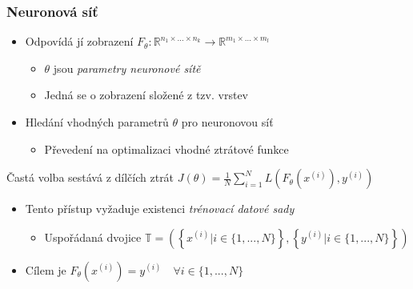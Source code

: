 \documentclass[czech]{beamer}
\begin{document}
\begin{frame}
    \frametitle{Neuronová síť}
    \begin{itemize}
        \item Odpovídá jí zobrazení $F_\theta: \mathbb{R}^{n_1 \times ... \times n_k} \rightarrow \mathbb{R}^{m_1 \times ... \times m_l}$
        \begin{itemize}
            \item $\theta$ jsou \emph{parametry neuronové sítě}
            \item Jedná se o zobrazení složené z tzv. vrstev \cite{Goodfellow}
        \end{itemize}
        \item Hledání vhodných parametrů $\theta$ pro neuronovou síť
        \begin{itemize}
            \item Převedení na optimalizaci vhodné ztrátové funkce
        \end{itemize}
    \end{itemize}
    \begin{block}{Častá volba sestává z dílčích ztrát}
        \centering
        $J(\theta) = \frac{1}{N} \sum_{i=1}^N L\left(F_\theta(x^{(i)}), y^{(i)}\right)$
    \end{block}
    \begin{itemize}
        \item Tento přístup vyžaduje existenci \emph{trénovací datové sady}
        \begin{itemize}
            \item Uspořádaná dvojice 
            $\mathbb{T} = \left(\left\{x^{(i)} | i \in \{1, ..., N\}\right\}, \left\{y^{(i)} | i \in \{1, ..., N\}\right\}\right)$
        \end{itemize}
        \item Cílem je $F_\theta(x^{(i)}) = y^{(i)} \quad \forall i \in \{1, ..., N\}$  
    \end{itemize}
\end{frame}
\end{document}
